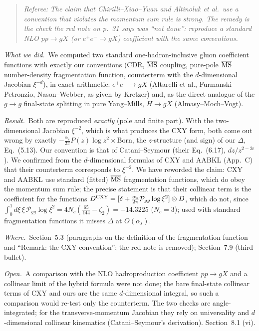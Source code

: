 \documentclass[a4paper,11pt]{article}
\newcommand{\MS}{\overline{\rm MS}}
\newcommand{\referee}[1]{\begin{quote}\small\emph{Referee:} \emph{#1}\end{quote}}
\newcommand{\done}{\par\noindent\emph{What we did.}\ }
\newcommand{\result}{\par\noindent\emph{Result.}\ }
\newcommand{\where}{\par\noindent\emph{Where.}\ }
\newcommand{\open}{\par\noindent\emph{Open.}\ }
\begin{document}
\referee{The claim that Chirilli--Xiao--Yuan and Altinoluk et al.\ use a convention that violates the momentum sum rule is strong. The remedy is the check the red note on p.~31 says was ``not done'': reproduce a standard NLO $pp\to gX$ (or $e^+e^-\to gX$) coefficient with the same conventions.}
\done We computed two standard one-hadron-inclusive gluon coefficient functions with exactly our conventions (CDR, $\MS$ coupling, pure-pole $\MS$ number-density fragmentation function, counterterm with the $d$-dimensional Jacobian $\xi^{-d}$), in exact arithmetic: $e^+e^-\to gX$ (Altarelli et al., Furmanski--Petronzio, Nason--Webber, as given by Kretzer) and, as the direct analogue of the $g\to g$ final-state splitting in pure Yang--Mills, $H\to gX$ (Almasy--Moch--Vogt).
\result Both are reproduced \emph{exactly} (pole and finite part). With the two-dimensional Jacobian $\xi^{-2}$, which is what produces the CXY form, both come out wrong by exactly $-\frac{\alpha_s}{2\pi}P(z)\log z^2\times$Born, the $z$-structure (and sign) of our $\Delta$, Eq.~(5.13). Our convention is that of Catani--Seymour (their Eq.~(6.17), $dz/z^{2-2\epsilon}$). We confirmed from the $d$-dimensional formulas of CXY and AABKL (App.~C) that their counterterm corresponds to $\xi^{-2}$. We have reworded the claim: CXY and AABKL use standard (fitted) $\MS$ fragmentation functions, which do obey the momentum sum rule; the precise statement is that their collinear term is the coefficient for the functions $D^{\rm CXY}=[\delta+\frac{\alpha_s}{2\pi}\mathcal P_{gg}\log\xi^2]\otimes D$, which do not, since $\int_0^1d\xi\,\xi\,\mathcal P_{gg}\log\xi^2=4N_c(\frac{65}{144}-\zeta_2)=-14.3225$ ($N_c=3$); used with standard fragmentation functions it misses $\Delta$ at $O(\alpha_s)$.
\where Section~5.3 (paragraphs on the definition of the fragmentation function and ``Remark: the CXY convention''; the red note is removed); Section~7.9 (third bullet).
\open A comparison with the NLO hadroproduction coefficient $pp\to gX$ and a collinear limit of the hybrid formula were not done; the bare final-state collinear terms of CXY and ours are the same $d$-dimensional integral, so such a comparison would re-test only the counterterm. The two checks are angle-integrated; for the transverse-momentum Jacobian they rely on universality and $d$-dimensional collinear kinematics (Catani--Seymour's derivation). Section~8.1 (vi).
\end{document}
